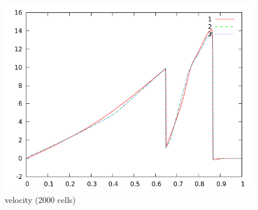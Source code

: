 \documentclass[letterpaper,12pt]{article}
\begin{document}
\begin{figure}[h]
  \begin{center}
     \includegraphics[width=.78\textwidth]{vel_T12_2000.png}	
  \end{center}
  \caption{velocity (2000 cells)}
\end{figure}



\end{document}
